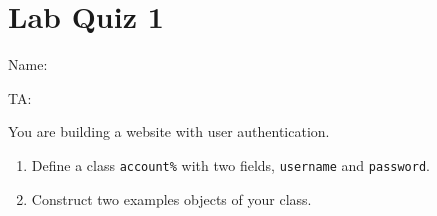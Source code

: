 \documentclass[12pt]{article}
\begin{document}
\section*{Lab Quiz 1}

\bigskip
Name: \underline{\hspace*{4in}}

\bigskip
TA: \underline{\hspace*{4in}}

\bigskip
\bigskip
\setlength{\parskip}{8pt}

You are building a website with user authentication.
\begin{enumerate}
\item Define a class \texttt{account\%} with two fields, \texttt{username} and
\texttt{password}.
\item Construct two examples objects of your class.
\end{enumerate}
\end{document}
